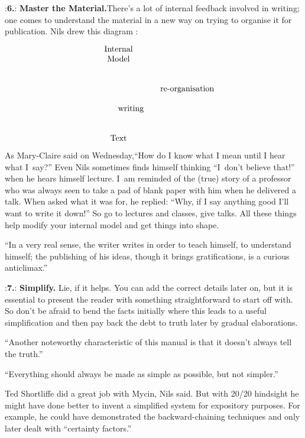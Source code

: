 \smallskip
\display 20pt:{\bf 6.}:
{\bf Master the Material.}\quad There's a lot of internal feedback
involved in writing; one comes to understand the material in a new way
on trying to organise it for publication. Nils drew this diagram :

\bigskip
$$\vcenter{\halign{\hfil#\hfil\qquad&#\hfil\cr
Internal\cr
Model\cr
\noalign{\bigskip\bigskip}
&re-organisation\cr
\noalign{\bigskip}
\qquad\quad writing\cr
\noalign{\bigskip\bigskip}
Text\cr
}}$$

\bigskip

As Mary-Claire said on Wednesday,``How do I know what I mean until I
hear what I~say?'' Even Nils sometimes finds himself thinking 
``I~don't believe that!'' when he hears himself lecture. I~am reminded of
the (true) story of a professor who was always seen to take a pad of
blank paper with him when he delivered a talk. When asked what it was
for, he replied: ``Why, if I say anything good I'll want to write it
down!'' So go to lectures and classes, give talks. All these things
help modify your internal model and get things into shape.

{\narrower\smallskip\noindent
``In a very real sense, the writer writes in order to teach himself,
to understand himself; the publishing of his ideas, though it
brings gratifications, is a curious anticlimax.''  
\smallskip}

\smallskip
\display 20pt:{\bf 7.}:
{\bf Simplify.} \quad Lie, if it helps. You can add the correct details later
on, but it is essential to present the reader with something
straightforward to start off with. So don't be afraid to bend the
facts initially where this leads to a useful simplification and then
pay back the debt to truth later by gradual elaborations.

{\narrower\smallskip\noindent
``Another noteworthy characteristic of this manual is that it doesn't
always tell the truth.''
\smallskip}

{\narrower\smallskip\noindent
``Everything should always be made as simple as possible, but not simpler.''
\smallskip}

Ted Shortliffe  did a great job with Mycin, Nils
said. But with 20/20 hindsight he might have done better to invent a
simplified system for expository purposes. For example, he could have
demonstrated the backward-chaining techniques and only later dealt
with ``certainty factors.''

